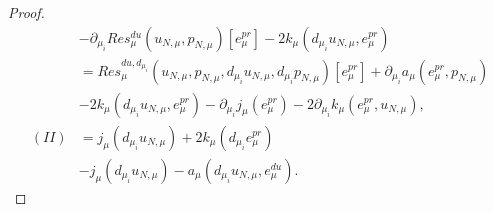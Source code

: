 \begin{proof}
\begin{align}
        &- \partial_{\mu_i} Res_\mu^{du}(u_{N, \mu}, p_{N, \mu})[e_\mu^{pr}] - 2 k_\mu(d_{\mu_i} u_{N, \mu}, e_\mu^{pr}) \nonumber\\
        &= Res_\mu^{du, d_{\mu_i}}(u_{N, \mu}, p_{N, \mu}, d_{\mu_i} u_{N, \mu}, d_{\mu_i} p_{N, \mu})[e_\mu^{pr}] + \partial_{\mu_i} a_\mu(e_\mu^{pr}, p_{N, \mu}) \nonumber\\
        &- 2 k_\mu(d_{\mu_i} u_{N, \mu}, e_\mu^{pr}) - \partial_{\mu_i} j_\mu(e_\mu^{pr}) - 2 \partial_{\mu_i} k_\mu(e_\mu^{pr}, u_{N, \mu}), \nonumber\\
        (II) &= j_\mu(d_{\mu_i} u_{N, \mu}) + 2 k_\mu(d_{\mu_i} e_\mu^{pr}) \label{PrfEq7}\\
        &- j_\mu(d_{\mu_i} u_{N, \mu}) - a_\mu(d_{\mu_i} u_{N, \mu}, e_\mu^{du}). \nonumber
    \end{align}
\end{proof}